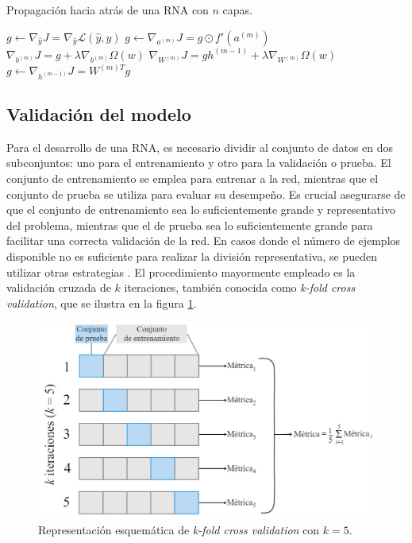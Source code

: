 \begin{algorithm}[H]
	\caption{Propagación hacia atrás de una RNA con $n$ capas.}
	\label{alg:backpropagation}
		\begin{algorithmic}
		\State $g \gets \nabla_{\hat{y}} J = \nabla_{\hat{y}} \mathcal{L}(\hat{y}, y)$ 
		\State $g \gets \nabla_{a^{(m)}} J = g \odot f'(a^{(m)})$ 
		\State $\nabla_{b^{(m)}} J = g + \lambda \nabla_{b^{(m)}} \Omega(w)$ 
		\State $\nabla_{W^{(m)}} J = g h^{(m-1)} + \lambda \nabla_{W^{(m)}} \Omega(w)$ 
		\State $g \gets \nabla_{h^{(m-1)}} J = W^{(m)T}g$ 
		\EndFor
	\end{algorithmic}
\end{algorithm}
\subsection{Validación del modelo}
Para el desarrollo de una RNA, es necesario dividir al conjunto de datos en dos subconjuntos: uno para el 
entrenamiento y otro para la validación o prueba. El conjunto de entrenamiento se emplea para entrenar a 
la red, mientras que el conjunto de prueba se utiliza para evaluar su desempeño. Es crucial asegurarse de 
que el conjunto de entrenamiento sea lo suficientemente grande y representativo del problema, mientras 
que el de prueba sea lo suficientemente grande para facilitar una correcta validación de la red. En casos 
donde el número de ejemplos disponible no es suficiente para realizar la división representativa, se 
pueden utilizar otras estrategias \citep{CITE:42}. 
El procedimiento mayormente empleado es la validación cruzada de $k$ 
iteraciones, también conocida como \emph{k-fold cross validation}, que se ilustra en la figura \ref{fig:crossval}. 

\begin{figure}[h!]
	\centering
	\includegraphics[width=\textwidth]{./Figures/cross_validation.jpg}
	\caption{Representación esquemática de \emph{k-fold cross validation} con $k=5$\protect\footnotemark.}
	\label{fig:crossval}
\end{figure}

